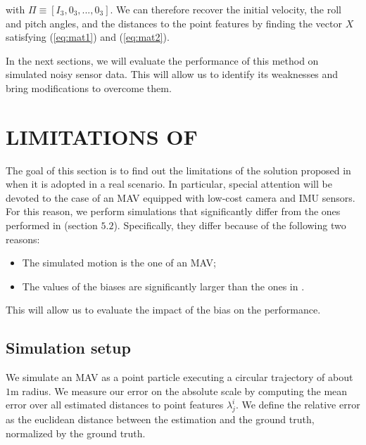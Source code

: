 \documentclass[letterpaper, 10pt, conference, final]{ieeeconf}  %
\begin{document}
\noindent with $\Pi \equiv [I_3, 0_3, ..., 0_3]$. We can therefore recover the initial velocity, the roll and pitch angles, and the distances to the point features
by finding the vector $X$ satisfying (\ref{eq:mat1}) and (\ref{eq:mat2}).

In the next sections, we will evaluate the performance of this method on simulated noisy sensor data.
This will allow us to identify its weaknesses and bring modifications to overcome them.





\section{LIMITATIONS OF \cite{Martinelli2014}}\label{SectionBottlenecks}

The goal of this section is to find out the limitations of the solution proposed in \cite{Martinelli2014} when it is adopted in a real scenario. In particular, special attention will be devoted to the case of an MAV equipped with low-cost camera and IMU sensors. For this reason, we perform simulations that significantly differ from the ones performed in \cite{Martinelli2014} (section $5.2$). Specifically, they differ because of the following two reasons:
\begin{itemize}
\item The simulated motion is the one of an MAV;
\item The values of the biases are significantly larger than the ones in \cite{Martinelli2014}.
\end{itemize}
This will allow us to evaluate the impact of the bias on the performance.

\subsection{Simulation setup}\label{SubsectionConsidered}

We simulate an MAV as a point particle executing a circular trajectory of about $1$m radius.
We measure our error on the absolute scale by computing the mean error over all estimated distances to point features $\lambda_j^i$.
We define the relative error as the euclidean distance between the estimation and the ground truth,
normalized by the ground truth.
\end{document}
